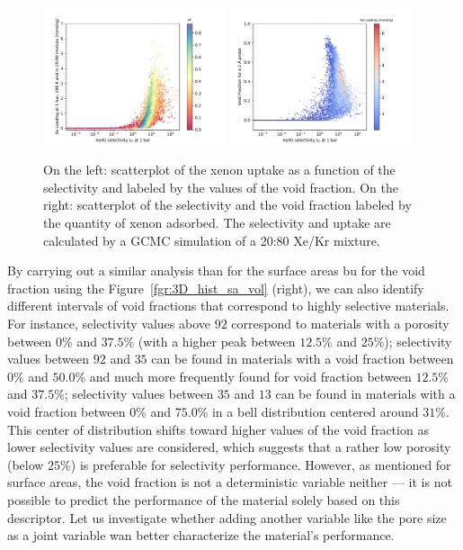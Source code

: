 \documentclass[main.tex]{subfiles}
\begin{document}
\begin{figure}[ht]
  \centering
  \includegraphics[width=0.48\textwidth]{figures/2-thermo/Scatterplot_uptake_selectivity_vol.pdf}
  \includegraphics[width=0.48\textwidth]{figures/2-thermo/Scatterplot_vol_selectivity.pdf}
  \caption{On the left: scatterplot of the xenon uptake as a function of the selectivity and labeled by the values of the void fraction. On the right: scatterplot of the selectivity and the void fraction labeled by the quantity of xenon adsorbed. The selectivity and uptake are calculated by a GCMC simulation of a 20:80 Xe/Kr mixture.}\label{fgr:vol}
\end{figure}

By carrying out a similar analysis than for the surface areas bu for the void fraction using the Figure~\ref{fgr:3D_hist_sa_vol} (right), we can also identify different intervals of void fractions that correspond to highly selective materials. For instance, selectivity values above $92$ correspond to materials with a porosity between {$0$\%} and {$37.5$\%} (with a higher peak between {$12.5$\%} and {$25$\%}); selectivity values between $92$ and $35$ can be found in materials with a void fraction between {$0$\%} and {$50.0$\%} and much more frequently found for void fraction between {$12.5$\%} and {$37.5$\%}; selectivity values between $35$ and $13$ can be found in materials with a void fraction between {$0$\%} and {$75.0$\%} in a bell distribution centered around {$31$\%}. This center of distribution shifts toward higher values of the void fraction as lower selectivity values are considered, which suggests that a rather low porosity (below {$25$\%}) is preferable for selectivity performance. However, as mentioned for surface areas, the void fraction is not a deterministic variable neither — it is not possible to predict the performance of the material solely based on this descriptor. Let us investigate whether adding another variable like the pore size as a joint variable wan better characterize the material's performance. 
\end{document}

